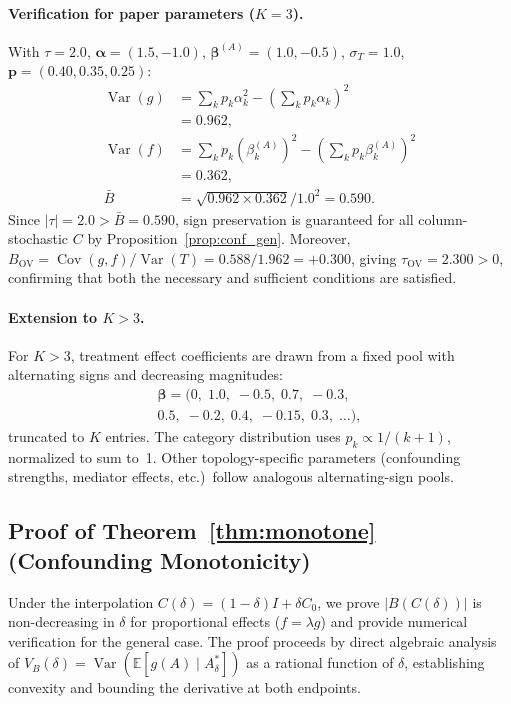 \paragraph{Verification for paper parameters ($K{=}3$).}
With $\tau{=}2.0$, $\boldsymbol{\alpha}{=}(1.5,{-}1.0)$, $\boldsymbol{\beta}^{(A)}{=}(1.0,{-}0.5)$, $\sigma_T{=}1.0$, $\mathbf{p}{=}(0.40,0.35,0.25)$:
\begin{align*}
  \operatorname{Var}(g) &= \textstyle\sum_k p_k\alpha_k^2 - (\sum_k p_k\alpha_k)^2\\
  &= 0.962,\\
  \operatorname{Var}(f) &= \textstyle\sum_k p_k(\beta_k^{(A)})^2 - (\sum_k p_k\beta_k^{(A)})^2\\
  &= 0.362,\\
  \bar{B} &= \sqrt{0.962\times 0.362}/1.0^2 = 0.590.
\end{align*}
Since $|\tau|{=}2.0 > \bar{B}{=}0.590$, sign preservation is guaranteed for all column-stochastic $C$ by Proposition~\ref{prop:conf_gen}.
Moreover, $B_{\mathrm{OV}}=\operatorname{Cov}(g,f)/\operatorname{Var}(T)=0.588/1.962={+}0.300$, giving $\tau_{\mathrm{OV}}{=}2.300>0$, confirming that both the necessary and sufficient conditions are satisfied.

\paragraph{Extension to $K > 3$.}
For $K{>}3$, treatment effect coefficients are drawn from a fixed pool with alternating signs and decreasing magnitudes:
\begin{multline*}
  \boldsymbol{\beta} = (0,\; 1.0,\; {-}0.5,\; 0.7,\; {-}0.3,\\
  0.5,\; {-}0.2,\; 0.4,\; {-}0.15,\; 0.3,\; \ldots),
\end{multline*}
truncated to $K$ entries. The category distribution uses $p_k \propto 1/(k{+}1)$, normalized to sum to~1. Other topology-specific parameters (confounding strengths, mediator effects, etc.)\ follow analogous alternating-sign pools.

\subsection{Proof of Theorem~\ref{thm:monotone} (Confounding Monotonicity)}
\label{app:monotonicity_proof}

Under the interpolation $C(\delta)=(1{-}\delta)I+\delta C_0$, we prove $|B(C(\delta))|$ is non-decreasing in $\delta$ for proportional effects ($f=\lambda g$) and provide numerical verification for the general case.
The proof proceeds by direct algebraic analysis of $V_B(\delta)=\operatorname{Var}(\mathbb{E}[g(A)\mid A^*_\delta])$ as a rational function of $\delta$, establishing convexity and bounding the derivative at both endpoints.

